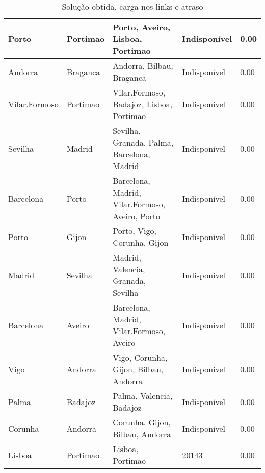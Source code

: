\begin{table}[!htb]
{\begin{tabular}{|l|l|l|l|l|}
Porto & Portimao & Porto, Aveiro, Lisboa, Portimao & Indisponível & 0.00 \\ \hline
Andorra & Braganca & Andorra, Bilbau, Braganca & Indisponível & 0.00 \\ \hline
Vilar.Formoso & Portimao & Vilar.Formoso, Badajoz, Lisboa, Portimao & Indisponível & 0.00 \\ \hline
Sevilha & Madrid & Sevilha, Granada, Palma, Barcelona, Madrid & Indisponível & 0.00 \\ \hline
Barcelona & Porto & Barcelona, Madrid, Vilar.Formoso, Aveiro, Porto & Indisponível & 0.00 \\ \hline
Porto & Gijon & Porto, Vigo, Corunha, Gijon & Indisponível & 0.00 \\ \hline
Madrid & Sevilha & Madrid, Valencia, Granada, Sevilha & Indisponível & 0.00 \\ \hline
Barcelona & Aveiro & Barcelona, Madrid, Vilar.Formoso, Aveiro & Indisponível & 0.00 \\ \hline
Vigo & Andorra & Vigo, Corunha, Gijon, Bilbau, Andorra & Indisponível & 0.00 \\ \hline
Palma & Badajoz & Palma, Valencia, Badajoz & Indisponível & 0.00 \\ \hline
Corunha & Andorra & Corunha, Gijon, Bilbau, Andorra & Indisponível & 0.00 \\ \hline
Lisboa & Portimao & Lisboa, Portimao & 20143 & 0.00 \\ \hline
\end{tabular}}
\caption[]{Solução obtida, carga nos links e atraso}
\end{table}

